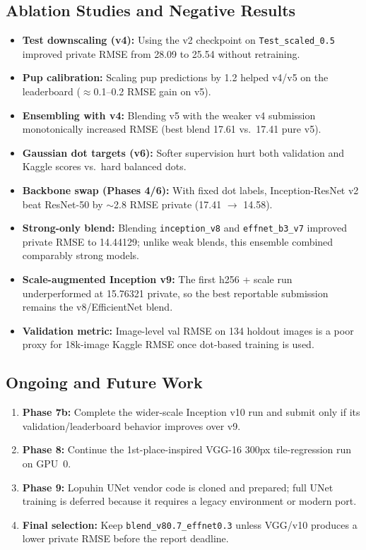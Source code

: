 \documentclass[12pt, a4paper]{article}
\begin{document}
\subsection{Ablation Studies and Negative Results}
\begin{itemize}
    \item \textbf{Test downscaling (v4):} Using the v2 checkpoint on \texttt{Test\_scaled\_0.5} improved private RMSE from 28.09 to 25.54 without retraining.
    \item \textbf{Pup calibration:} Scaling pup predictions by 1.2 helped v4/v5 on the leaderboard ($\approx$0.1--0.2 RMSE gain on v5).
    \item \textbf{Ensembling with v4:} Blending v5 with the weaker v4 submission monotonically increased RMSE (best blend 17.61 vs.\ 17.41 pure v5).
    \item \textbf{Gaussian dot targets (v6):} Softer supervision hurt both validation and Kaggle scores vs.\ hard balanced dots.
    \item \textbf{Backbone swap (Phases 4/6):} With fixed dot labels, Inception-ResNet v2 beat ResNet-50 by $\sim$2.8 RMSE private (17.41 $\rightarrow$ 14.58).
    \item \textbf{Strong-only blend:} Blending \texttt{inception\_v8} and \texttt{effnet\_b3\_v7} improved private RMSE to 14.44129; unlike weak blends, this ensemble combined comparably strong models.
    \item \textbf{Scale-augmented Inception v9:} The first h256 + scale run underperformed at 15.76321 private, so the best reportable submission remains the v8/EfficientNet blend.
    \item \textbf{Validation metric:} Image-level val RMSE on 134 holdout images is a poor proxy for 18k-image Kaggle RMSE once dot-based training is used.
\end{itemize}

\subsection{Ongoing and Future Work}
\begin{enumerate}
    \item \textbf{Phase 7b:} Complete the wider-scale Inception v10 run and submit only if its validation/leaderboard behavior improves over v9.
    \item \textbf{Phase 8:} Continue the 1st-place-inspired VGG-16 300px tile-regression run on GPU~0.
    \item \textbf{Phase 9:} Lopuhin UNet vendor code is cloned and prepared; full UNet training is deferred because it requires a legacy environment or modern port.
    \item \textbf{Final selection:} Keep \texttt{blend\_v80.7\_effnet0.3} unless VGG/v10 produces a lower private RMSE before the report deadline.
\end{enumerate}
\end{document}
